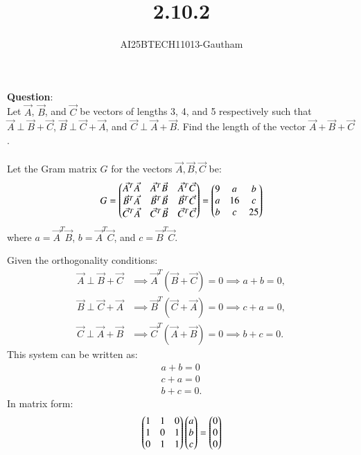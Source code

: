 \documentclass[journal]{IEEEtran}
\begin{document}

\vspace{3cm}
\title{2.10.2}
\author{AI25BTECH11013-Gautham}
\maketitle
{\let\newpage\relax\maketitle}
\renewcommand{\thefigure}{\theenumi}
\renewcommand{\thetable}{\theenumi}
\setlength{\intextsep}{10pt} %
\renewcommand{\thetable}{\theenumi}
\textbf{Question}:\\
Let $\Vec{A}$, $\Vec{B}$, and $\Vec{C}$ be vectors of lengths 3, 4, and 5 respectively such that 
$\Vec{A} \perp \Vec{B} + \Vec{C}$,
$\Vec{B} \perp \Vec{C} + \Vec{A}$, and
$\Vec{C} \perp \Vec{A} + \Vec{B}$. Find the length of the vector $\Vec{A} + \Vec{B} + \Vec{C}$.\\
\solution \\

Let the Gram matrix $G$ for the vectors $\Vec{A}, \Vec{B}, \Vec{C}$ be:
\begin{align}
G = \begin{pmatrix}
\Vec{A}^T \Vec{A} & \Vec{A}^T \Vec{B} & \Vec{A}^T \Vec{C} \\
\Vec{B}^T \Vec{A} & \Vec{B}^T \Vec{B} & \Vec{B}^T \Vec{C} \\
\Vec{C}^T \Vec{A} & \Vec{C}^T \Vec{B} & \Vec{C}^T \Vec{C}
\end{pmatrix}
= \begin{pmatrix}
9 & a & b \\
a & 16 & c \\
b & c & 25
\end{pmatrix}
\end{align}
where $a = \Vec{A}^T \Vec{B}$, $b = \Vec{A}^T \Vec{C}$, and $c = \Vec{B}^T \Vec{C}$.

Given the orthogonality conditions:
\begin{align}
\Vec{A} \perp \Vec{B} + \Vec{C} &\implies \Vec{A}^T (\Vec{B} + \Vec{C}) = 0 \implies a + b = 0, \\
\Vec{B} \perp \Vec{C} + \Vec{A} &\implies \Vec{B}^T (\Vec{C} + \Vec{A}) = 0 \implies c + a = 0, \\
\Vec{C} \perp \Vec{A} + \Vec{B} &\implies \Vec{C}^T (\Vec{A} + \Vec{B}) = 0 \implies b + c = 0.
\end{align}
This system can be written as:
\begin{align}
a + b = 0 \\
c + a = 0 \\
b + c = 0.
\end{align}
In matrix form:
\begin{align}
\begin{pmatrix}
1 & 1 & 0 \\
1 & 0 & 1 \\
0 & 1 & 1
\end{pmatrix}
\begin{pmatrix}
a \\ b \\ c
\end{pmatrix}
= \begin{pmatrix}
0 \\ 0 \\ 0
\end{pmatrix}
\end{align}
\end{document}
